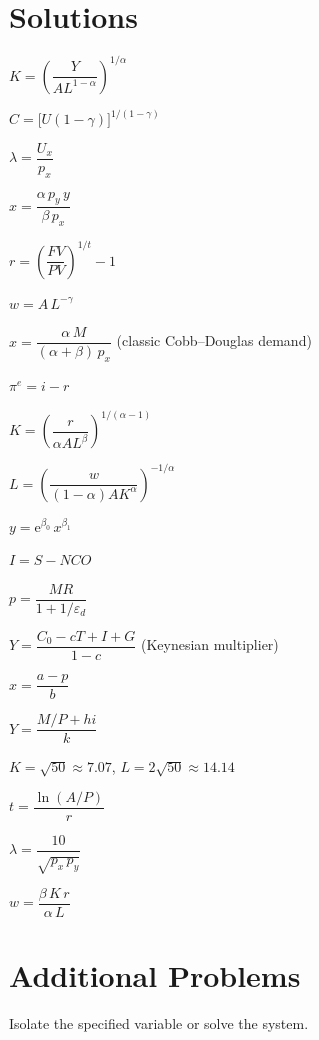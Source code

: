 \section{Solutions}

\begin{solutions}
  \item $K = \left( \dfrac{Y}{A L^{1 - \alpha}} \right)^{1/\alpha}$
  \item $C = \bigl[ U (1 - \gamma) \bigr]^{1 / (1 - \gamma)}$
  \item $\lambda = \dfrac{U_x}{p_x}$
  \item $x = \dfrac{\alpha \, p_y \, y}{\beta \, p_x}$
  \item $r = \left( \dfrac{FV}{PV} \right)^{1/t} - 1$
  \item $w = A \, L^{-\gamma}$
  \item $x = \dfrac{\alpha \, M}{(\alpha + \beta) \, p_x}$
        \;(classic Cobb--Douglas demand)
  \item $\pi^e = i - r$
  \item $K = \left( \dfrac{r}{\alpha A L^{\beta}} \right)^{1 / (\alpha - 1)}$
  \item $L = \left( \dfrac{w}{(1 - \alpha) A K^{\alpha}} \right)^{-1/\alpha}$
  \item $y = \mathrm{e}^{\beta_0} \, x^{\beta_1}$
  \item $I = S - NCO$
  \item $p = \dfrac{MR}{1 + 1 / \varepsilon_d}$
  \item $Y = \dfrac{C_0 - c T + I + G}{1 - c}$ \;(Keynesian multiplier)
  \item $x = \dfrac{a - p}{b}$
  \item $Y = \dfrac{M / P + h i}{k}$
  \item $K = \sqrt{50} \approx 7.07$, \;$L = 2 \sqrt{50} \approx 14.14$
  \item $t = \dfrac{\ln(A / P)}{r}$
  \item $\lambda = \dfrac{10}{\sqrt{p_x \, p_y}}$
  \item $w = \dfrac{\beta \, K \, r}{\alpha \, L}$
\end{solutions}

\section{Additional Problems}

Isolate the specified variable or solve the system.

